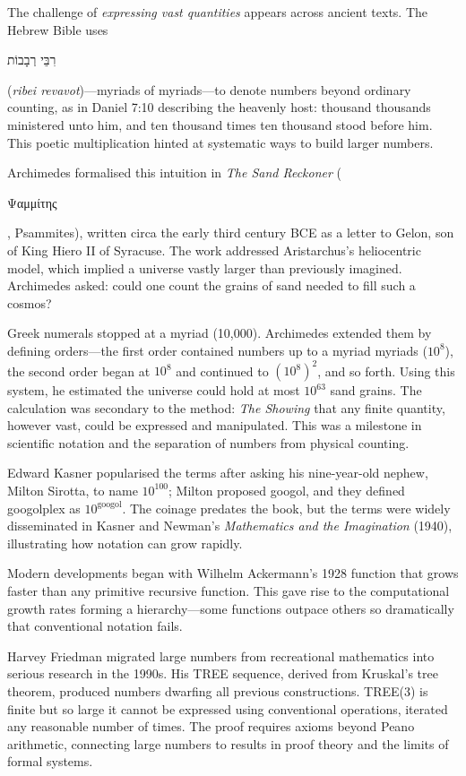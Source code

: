 
\begin{historical}
    The challenge of \textit{expressing vast quantities} appears across ancient texts. The Hebrew Bible uses \begin{hebrew}\QSOpen{}רִבֵּי רְבָבוֹת\QSClose{}\end{hebrew} (\textit{ribei revavot})—myriads of myriads—to denote numbers beyond ordinary counting, as in Daniel 7:10 describing the heavenly host: \QSOpen{}thousand thousands ministered unto him, and ten thousand times ten thousand stood before him.\QSClose{} This poetic multiplication hinted at systematic ways to build larger numbers.

Archimedes formalised this intuition in \textit{The Sand Reckoner} (\begin{greek}Ψαμμίτης\end{greek}, Psammites), written circa the early third century BCE as a letter to Gelon, son of King Hiero II of Syracuse. The work addressed Aristarchus's heliocentric model, which implied a universe vastly larger than previously imagined. Archimedes asked: could one count the grains of sand needed to fill such a cosmos? 

Greek numerals stopped at a myriad (10,000). Archimedes extended them by defining \QSOpen{}orders\QSClose{}—the first order contained numbers up to a myriad myriads ($10^8$), the second order began at $10^8$ and continued to $(10^8)^2$, and so forth. Using this system, he estimated the universe could hold at most $10^{63}$ sand grains. The calculation was secondary to the method: \textit{The Showing} that any finite quantity, however vast, could be expressed and manipulated. This was a milestone in scientific notation and the separation of numbers from physical counting.

Edward Kasner popularised the terms after asking his nine-year-old nephew, Milton Sirotta, to name $10^{100}$; Milton proposed \QSOpen{}googol,\QSClose{} and they defined \QSOpen{}googolplex\QSClose{} as $10^{\text{googol}}$. The coinage predates the book, but the terms were widely disseminated in Kasner and Newman's \textit{Mathematics and the Imagination} (1940), illustrating how notation can grow rapidly.

Modern developments began with Wilhelm Ackermann's 1928 function that grows faster than any primitive recursive function. This gave rise to the computational growth rates forming a hierarchy—some functions outpace others so dramatically that conventional notation fails.

Harvey Friedman migrated large numbers from recreational mathematics into serious research in the 1990s. His TREE sequence, derived from Kruskal's tree theorem, produced numbers dwarfing all previous constructions. TREE(3) is finite but so large it cannot be expressed using conventional operations, iterated any reasonable number of times. The proof requires axioms beyond Peano arithmetic, connecting large numbers to results in proof theory and the limits of formal systems.
\end{historical}